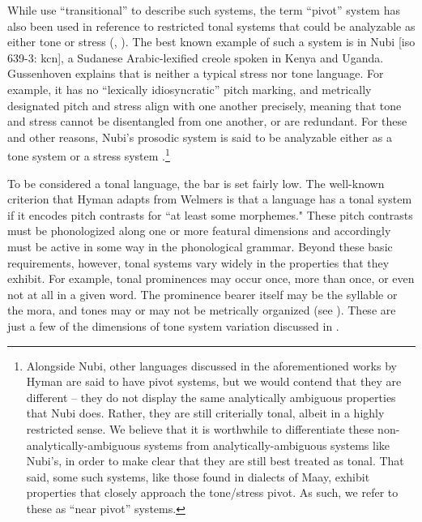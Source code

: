 \documentclass[output=paper,colorlinks,citecolor=brown]{langscibook}
\begin{document}
While \citet{ClementsGoldsmith1984} use ``transitional'' to describe such systems, the term ``pivot'' system has also been used in reference to restricted tonal systems that could be analyzable as either tone or stress (\citealt[228]{Hyman2006}, \citeyear[234]{Hyman2009}). The best known example of such a system is in Nubi [iso 639-3: kcn], a Sudanese Arabic-lexified creole spoken in Kenya and Uganda. Gussenhoven \citeyearpar{Gussenhoven2006} explains that  is neither a typical stress nor tone language. For example, it has no ``lexically idiosyncratic'' pitch marking, and metrically designated pitch and stress align with one another precisely, meaning that tone and stress cannot be disentangled from one another, or are redundant. For these and other reasons, Nubi's prosodic system is said to be analyzable either as a tone system or a stress system \citep{Gussenhoven2006,Hyman2009}.\footnote{Alongside Nubi, other languages discussed in the aforementioned works by Hyman are said to have pivot systems, but we would contend that they are different -- they do not display the same analytically ambiguous properties that Nubi does. Rather, they are still criterially tonal, albeit in a highly restricted sense. We believe that it is worthwhile to differentiate these non-analytically-ambiguous systems from analytically-ambiguous systems like Nubi's, in order to make clear that they are still best treated as tonal. That said, some such systems, like those found in dialects of Maay, exhibit properties that closely approach the tone/stress pivot. As such, we refer to these as ``near pivot'' systems.}

To be considered a tonal language, the bar is set fairly low. The well-known criterion that Hyman \citeyearpar{Hyman2001} adapts from Welmers \citeyearpar{Welmers1959} is that a language has a tonal system if it encodes pitch contrasts for ``at least some morphemes." These pitch contrasts must be phonologized along one or more featural dimensions and accordingly must be active in some way in the phonological grammar. Beyond these basic requirements, however, tonal systems vary widely in the properties that they exhibit. For example, tonal  prominences may occur once, more than once, or even not at all in a given word. The prominence bearer itself may be the syllable or the mora, and tones may or may not be metrically organized (see \citealt{AkinlabiLiberman2001,Green2015,Leben1997,Leben2003,Pearce2013}). These are just a few of the dimensions of tone system variation discussed in \citet{Hyman2009}.
\end{document}
